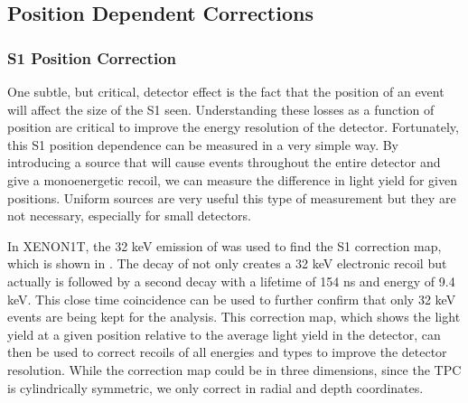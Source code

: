 \subsection{Position Dependent Corrections}
\label{sec:xe1t_pos_dependent_corrections}

\subsubsection{S1 Position Correction}
\label{sec:xe1t_lce_pos_correction}

One subtle, but critical, detector effect is the fact that the position of an event will affect the size of the S1 seen.  Understanding these losses as a function of position are critical to improve the energy resolution of the detector.  Fortunately, this S1 position dependence can be measured in a very simple way.  By introducing a source that will cause events throughout the entire detector and give a monoenergetic recoil, we can measure the difference in light yield for given positions.  Uniform sources are very useful this type of measurement but they are not necessary, especially for small detectors.

In XENON1T, the 32 keV emission of  was used to find the S1 correction map, which is shown in .  The decay of  not only creates a 32 keV electronic recoil but actually is followed by a second decay with a lifetime of 154 ns and energy of 9.4 keV.  This close time coincidence can be used to further confirm that only 32 keV events are being kept for the analysis.  This correction map, which shows the light yield at a given position relative to the average light yield in the detector, can then be used to correct recoils of all energies and types to improve the detector resolution.  While the correction map could be in three dimensions, since the TPC is cylindrically symmetric, we only correct in radial and depth coordinates.


